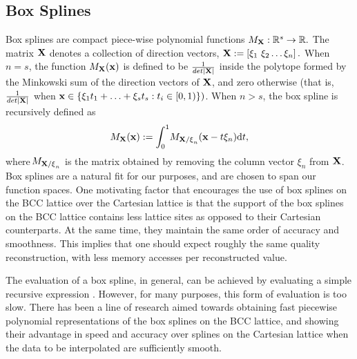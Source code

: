 \subsection{Box Splines}
\label{sec:box_review}
Box splines are compact piece-wise polynomial functions $ M_\mathbf{\mathbf{X}} : \mathbb{R}^s \to \mathbb{R}.$ The matrix $\mathbf{\mathbf{X}}$ denotes a collection of direction vectors, $\mathbf{\mathbf{X}} := \left[ \xi_1 \ \xi_2 \hdots \xi_n\right].$ When $n=s$, the function $M_\mathbf{\mathbf{X}}(\mathbf{x})$ is defined to be $\frac{1}{det|\mathbf{\mathbf{X}}|}$ inside the polytope formed by the Minkowski sum of the direction vectors of $\mathbf{\mathbf{X}}$, and zero otherwise (that is, $\frac{1}{det|\mathbf{\mathbf{X}}|}$ when $\mathbf{x} \in \{ \mathbf{\xi}_1 t_1 + \hdots + \mathbf{\xi}_s t_s  : t_i\in [0,1) \})$. When $n > s$, the box spline is recursively defined as {\small 
\begin{equation} \label{eq:box_def}
	M_{\mathbf{\Xii}}(\vx) := \int_0^1{\!M_{\mathbf{\Xii/\xi}_n}(\vx - t\mathbf{\xi}_n)} \mathrm{d}t,
\end{equation}}
where $\!M_{\mathbf{\mathbf{X}/\xi}_n}$ is the matrix obtained by removing the column vector $\xi_n$ from $\mathbf{\mathbf{X}}$. Box splines are a natural fit for our purposes, and are chosen to span our function spaces. One motivating factor that encourages the use of box splines on the BCC lattice over the Cartesian lattice is that the support of the box splines on the BCC lattice contains less lattice sites as opposed to their Cartesian counterparts. At the same time, they maintain the same order of accuracy and smoothness. This implies that one should expect roughly the same quality reconstruction, with less memory accesses per reconstructed value.

The evaluation of a box spline, in general, can be achieved by evaluating a simple recursive expression \cite{boorboxsplines}. However, for many purposes, this form of evaluation is too slow. There has been a line of research \cite{firstbox} aimed towards obtaining fast piecewise polynomial representations of the box splines on the BCC lattice, and showing their advantage in speed and accuracy over splines on the Cartesian lattice when the data to be interpolated are sufficiently smooth.

